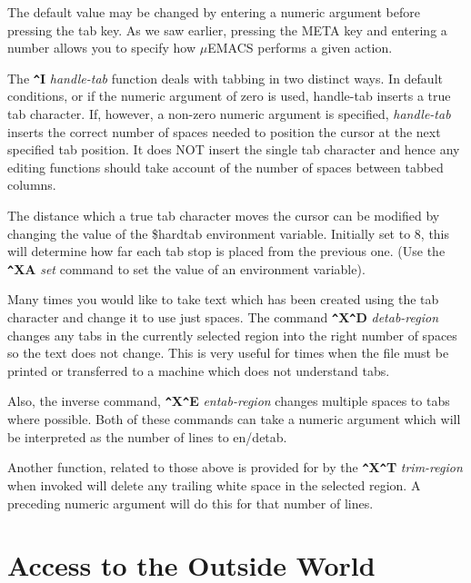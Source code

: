 The default value may be changed by entering a numeric argument before
pressing the tab key. As we saw earlier, pressing the META key and
entering a number allows you to specify how $\mu$EMACS performs a given
action.

The {\bf \verb+^+I} {\it handle-tab} function deals with
tabbing in two distinct ways. In default conditions, or if
the numeric argument of zero is used, handle-tab inserts a
true tab character. If, however, a non-zero numeric
argument is specified, {\it handle-tab} inserts the correct
number of spaces needed to position the cursor at the next
specified tab position. It does NOT insert the single tab
character and hence any editing functions should take
account of the number of spaces between tabbed columns.

The distance which a true tab character moves the cursor can be
modified by changing the value of the \$hardtab environment variable.
Initially set to 8, this will determine how far each tab stop is placed
from the previous one. (Use the {\bf \verb+^+XA} {\it set} command to
set the value of an environment variable).

Many times you would like to take text which has been created using the
tab character and change it to use just spaces. The command {\bf
\verb+^+X\verb+^+D} {\it detab-region} changes any tabs in the currently
selected region into the right number of spaces so the text does not
change. This is very useful for times when the file must be printed or
transferred to a machine which does not understand tabs.

Also, the inverse command, {\bf \verb+^+X\verb+^+E} {\it entab-region}
changes multiple spaces to tabs where possible. Both of these commands
can take a numeric argument which will be interpreted as the number of
lines to en/detab.

Another function, related to those above is provided for by the {\bf
\verb+^+X\verb+^+T} {\it trim-region} when invoked will delete any
trailing white space in the selected region. A preceding numeric
argument will do this for that number of lines.

\chapter{Access to the Outside World}


